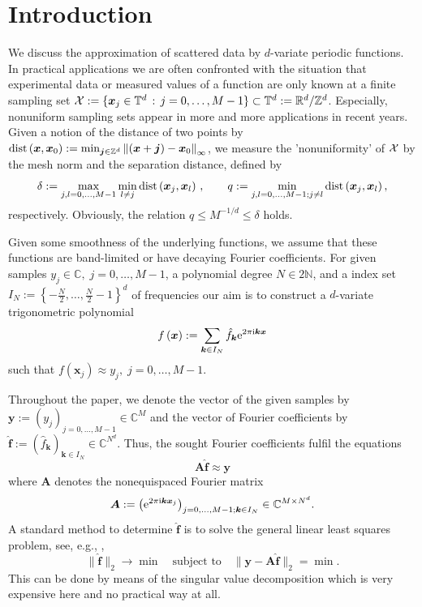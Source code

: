 \documentclass[11pt,a4paper,bibtotoc]{scrartcl}
\def\N{\mathbb{N}}
\def\R{\mathbb{R}}
\def\Z{\mathbb{Z}}
\def\C{\mathbb{C}}
\def\T{\mathbb{T}}
\def\ti{\mbox{\scriptsize{\rm i}}}
\newcommand{\eip}[1]{{\rm e}^{ 2\pi{\ti} #1}}
\newcommand{\zb}[1]{\ensuremath{\boldsymbol{#1}}}
\newcommand{\dist}{{\rm dist}}
\newcommand{\indexset}{{I_N}}
\numberwithin{equation}{section}
\numberwithin{table}{section}
\numberwithin{figure}{section}
\begin{document}
\section{Introduction}
We discuss the approximation of scattered data by $d$-variate periodic
functions. 
In practical applications we are often confronted with the situation that
experimental data or measured values of a function are only known at a finite
sampling set ${\cal X} := \{\zb x_j \in \T^d \,:\, j=0,\hdots,M-1\} \subset
\T^d:=\R^d/\Z^d$.
Especially, nonuniform sampling sets appear in more and more applications in
recent years.
Given a notion of the distance of two points by $\dist \left(\zb x,\zb
  x_0\right) := \min_{\zb j \in \mathbb Z^d} \left\| (\zb x+\zb j) - \zb
  x_0\right\|_{\infty}$, we measure the 'nonuniformity' of $\cal X$ by the
mesh norm and the separation distance, defined by
\begin{equation*}
  \delta:=\max\limits_{j,l=0,\hdots,M-1}\min\limits_{l\ne j}\dist\left(\zb
    x_j,\zb x_l\right)\,, \qquad q:=\min\limits_{j,l=0,\hdots,M-1;j\ne
    l}\dist\left(\zb x_j,\zb x_l\right),
\end{equation*}
respectively.
Obviously, the relation $q\le M^{-1/d}\le\delta$ holds.

Given some smoothness of the underlying functions, we assume that these
functions are band-limited or have decaying Fourier coefficients.
For given samples $y_j\in \mathbb{C},\; j=0,\hdots,M-1$, a polynomial degree
$N\in 2\N$, and a index set
$\indexset:=\left\{-\frac{N}{2},\hdots,\frac{N}{2}-1\right\}^d$ of frequencies
our aim is to construct a $d$-variate trigonometric polynomial
\begin{equation*}
  f\left(\zb x\right):=\sum\limits_{\zb k \in \indexset} \hat f_{\zb k}
  \eip{\zb k \zb x} 
\end{equation*}
such that  $f(\zb x_j) \approx y_j,\;j=0,\hdots,M-1$.

Throughout the paper, we denote the vector of the given samples by $\zb
y:=(y_{j})_{j=0,\ldots,M-1}\in \mathbb{C}^{M}$ and the vector of Fourier
coefficients by $\zb {\hat f}:=(\hat f_{\zb k})_{\zb k\in \indexset} \in
\mathbb{C}^{N^d}$.
Thus, the sought Fourier coefficients fulfil the equations
\begin{equation}
 \label{eq:1}
 \zb A \zb {\hat f} \approx \zb y
\end{equation}
where $\zb A$ denotes the nonequispaced Fourier matrix 
\begin{equation}
  \label{eq:A}
  \zb A:=\left(\eip{\zb k \zb x_j}\right)_{j=0,\hdots,M-1;\zb k \in \indexset}
  \in \C^{M\times N^d}.
\end{equation}
A standard method to determine $\zb {\hat f}$ is to solve the general linear
least squares problem, see, e.g., \cite[p. 15]{Bj96},
\begin{equation*}
  \|\zb {\hat f}\|_2 \rightarrow \min \quad \text{subject to} \quad
  \|\zb y - \zb A \zb {\hat f}\|_2=\min.
\end{equation*}
This can be done by means of the singular value decomposition which is very
expensive here and no practical way at all.
\end{document}
